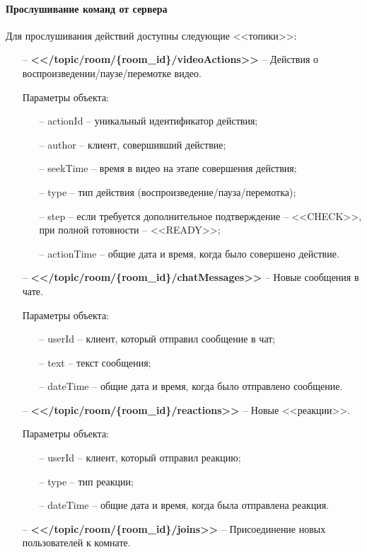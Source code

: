 \documentclass{../includes/TechDoc}
\begin{document}
    \paragraph{Прослушивание команд от сервера}
    Для прослушивания действий доступны следующие <<топики>>:
    \begin{itemize}
    	\item[--] \textbf{<</topic/room/\{room\_id\}/videoActions>>} -- Действия о воспроизведении/паузе/перемотке видео.

    	Параметры объекта:
    	\begin{itemize}[noitemsep]
    		\item[--] actionId -- уникальный идентификатор действия;
    		\item[--] author -- клиент, совершивший действие;
    		\item[--] seekTime -- время в видео на этапе совершения действия;
    		\item[--] type -- тип действия (воспроизведение/пауза/перемотка);
    		\item[--] step -- если требуется дополнительное подтверждение -- <<CHECK>>, при полной готовности -- <<READY>>;
    		\item[--] actionTime -- общие дата и время, когда было совершено действие.
    	\end{itemize}
    	\item[--] \textbf{<</topic/room/\{room\_id\}/chatMessages>>} -- Новые сообщения в чате.

    	Параметры объекта:
    	\begin{itemize}[noitemsep]
    		\item[--] userId -- клиент, который отправил сообщение в чат;
    		\item[--] text -- текст сообщения;
    		\item[--] dateTime -- общие дата и время, когда было отправлено сообщение.
    	\end{itemize}
    	\item[--] \textbf{<</topic/room/\{room\_id\}/reactions>>} -- Новые <<реакции>>.

    	Параметры объекта:
    	\begin{itemize}[noitemsep]
    		\item[--] userId -- клиент, который отправил реакцию;
    		\item[--] type -- тип реакции;
    		\item[--] dateTime -- общие дата и время, когда была отправлена реакция.
    	\end{itemize}
    	\item[--] \textbf{<</topic/room/\{room\_id\}/joins>>} -- Присоединение новых пользователей к комнате.


\end{itemize}
\end{document}
